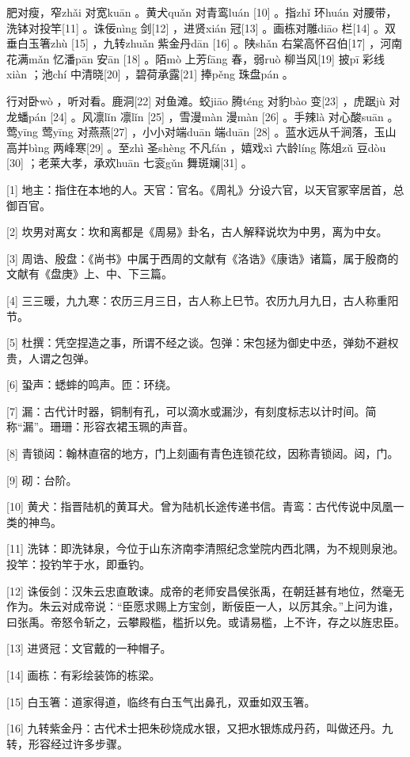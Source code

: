 \documentclass[12pt,UTF8]{ctexbook}
\begin{document}
肥对瘦，窄zhǎi 对宽kuān 。黄犬quǎn 对青鸾luán [10] 。指zhǐ 环huán 对腰带，洗钵对投竿[11] 。诛佞nìng 剑[12] ，进贤xián 冠[13] 。画栋对雕diāo 栏[14] 。双垂白玉箸zhù [15] ，九转zhuǎn 紫金丹dān [16] 。陕shǎn 右棠高怀召伯[17] ，河南花满mǎn 忆潘pān 安ān [18] 。陌mò 上芳fāng 春，弱ruò 柳当风[19] 披pī 彩线xiàn ；池chí 中清晓[20] ，碧荷承露[21] 捧pěng 珠盘pán 。

行对卧wò ，听对看。鹿洞[22] 对鱼滩。蛟jiāo 腾téng 对豹bào 变[23] ，虎踞jù 对龙蟠pán [24] 。风凛lǐn 凛lǐn [25] ，雪漫màn 漫màn [26] 。手辣là 对心酸suān 。莺yīng 莺yīng 对燕燕[27] ，小小对端duān 端duān [28] 。蓝水远从千涧落，玉山高并bìng 两峰寒[29] 。至zhì 圣shèng 不凡fán ，嬉戏xì 六龄líng 陈俎zǔ 豆dòu [30] ；老莱大孝，承欢huān 七衮gǔn 舞斑斓[31] 。


[1] 地主：指住在本地的人。天官：官名。《周礼》分设六官，以天官冢宰居首，总御百官。

[2] 坎男对离女：坎和离都是《周易》卦名，古人解释说坎为中男，离为中女。

[3] 周诰、殷盘：《尚书》中属于西周的文献有《洛诰》《康诰》诸篇，属于殷商的文献有《盘庚》上、中、下三篇。

[4] 三三暖，九九寒：农历三月三日，古人称上巳节。农历九月九日，古人称重阳节。

[5] 杜撰：凭空捏造之事，所谓不经之谈。包弹：宋包拯为御史中丞，弹劾不避权贵，人谓之包弹。

[6] 蛩声：蟋蟀的鸣声。匝：环绕。

[7] 漏：古代计时器，铜制有孔，可以滴水或漏沙，有刻度标志以计时间。简称“漏”。珊珊：形容衣裙玉珮的声音。

[8] 青锁闼：翰林直宿的地方，门上刻画有青色连锁花纹，因称青锁闼。闼，门。

[9] 砌：台阶。

[10] 黄犬：指晋陆机的黄耳犬。曾为陆机长途传递书信。青鸾：古代传说中凤凰一类的神鸟。

[11] 洗钵：即洗钵泉，今位于山东济南李清照纪念堂院内西北隅，为不规则泉池。投竿：投钓竿于水，即垂钓。

[12] 诛佞剑：汉朱云忠直敢谏。成帝的老师安昌侯张禹，在朝廷甚有地位，然毫无作为。朱云对成帝说：“臣愿求赐上方宝剑，断佞臣一人，以厉其余。”上问为谁，曰张禹。帝怒令斩之，云攀殿槛，槛折以免。或请易槛，上不许，存之以旌忠臣。

[13] 进贤冠：文官戴的一种帽子。

[14] 画栋：有彩绘装饰的栋梁。

[15] 白玉箸：道家得道，临终有白玉气出鼻孔，双垂如双玉箸。

[16] 九转紫金丹：古代术士把朱砂烧成水银，又把水银炼成丹药，叫做还丹。九转，形容经过许多步骤。
\end{document}
